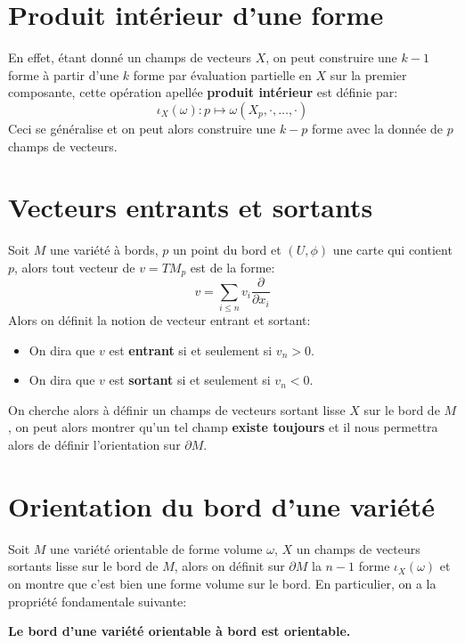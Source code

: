    \section{Produit intérieur d'une forme}
         En effet, étant donné un champs de vecteurs \( X \), on peut construire une \( k-1 \) forme à partir d'une \( k \) forme par évaluation partielle en \( X \) sur la premier composante, cette opération apellée \textbf{produit intérieur} est définie par:
         \[ 
            \iota_X(\omega) : p \mapsto \omega(X_p, \cdot, \ldots, \cdot)
         \]
         Ceci se généralise et on peut alors construire une \( k-p \) forme avec la donnée de \( p \) champs de vecteurs.
   \section{Vecteurs entrants et sortants}
      Soit $M$ une variété à bords, $p$ un point du bord et $(U, \phi)$ une carte qui contient $p$, alors tout vecteur de $v = TM_p$ est de la forme:
      \[ 
         v = \sum_{i \leq n} v_i \frac{\partial}{\partial x_i}
      \]
      Alors on définit la notion de vecteur entrant et sortant:
      \begin{itemize}
         \item On dira que $v$ est \textbf{entrant} si et seulement si $v_n > 0$.
         \item On dira que $v$ est \textbf{sortant} si et seulement si $v_n < 0$. 
      \end{itemize}
      On cherche alors à définir un champs de vecteurs sortant lisse \( X \) sur le bord de \( M \), on peut alors montrer qu'un tel champ \textbf{existe toujours} et il nous permettra alors de définir l'orientation sur \( \partial M \).  
   \section{Orientation du bord d'une variété}
      Soit $M$ une variété orientable de forme volume $\omega$, $X$ un champs de vecteurs sortants lisse sur le bord de \( M \), alors on définit sur $\partial M$ la $n-1$ forme $\iota_X(\omega)$ et on montre que c'est bien une forme volume sur le bord. En particulier, on a la propriété fondamentale suivante:
      \begin{center}
         \textbf{Le bord d'une variété orientable à bord est orientable.}
      \end{center}
